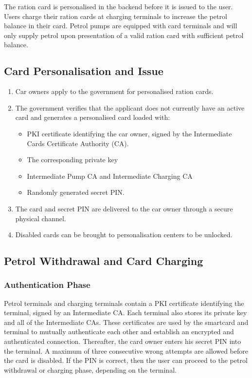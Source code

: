 The ration card is personalised in the backend before it is issued to the user. Users charge their ration cards at charging terminals to increase the petrol balance in their card. Petrol pumps are equipped with card terminals and will only supply petrol upon presentation of a valid ration card with sufficient petrol balance.

\subsection{Card Personalisation and Issue}

\begin{enumerate}
  \item Car owners apply to the government for personalised ration cards.
  \item The government verifies that the applicant does not currently have an active card and generates a personalised card loaded with: 
	\begin{itemize}
	  \item PKI certificate identifying the car owner, signed by the Intermediate Cards Certificate Authority (CA).
	  \item The corresponding private key
	  \item Intermediate Pump CA and Intermediate Charging CA
	  \item Randomly generated secret PIN.
	\end{itemize}
  \item The card and secret PIN are delivered to the car owner through a secure physical channel.
  \item Disabled cards can be brought to personalisation centers to be unlocked.
\end{enumerate}

\subsection{Petrol Withdrawal and Card Charging}
\subsubsection{Authentication Phase}
Petrol terminals and charging terminals contain a PKI certificate identifying the terminal, signed by an Intermediate CA. Each terminal also stores its private key and all of the Intermediate CAs. These certificates are used by the smartcard and terminal to mutually authenticate each other and establish an encrypted and authenticated connection. Thereafter, the card owner enters his secret PIN into the terminal. A maximum of three consecutive wrong attempts are allowed before the card is disabled. If the PIN is correct, then the user can proceed to the petrol withdrawal or charging phase, depending on the terminal.

